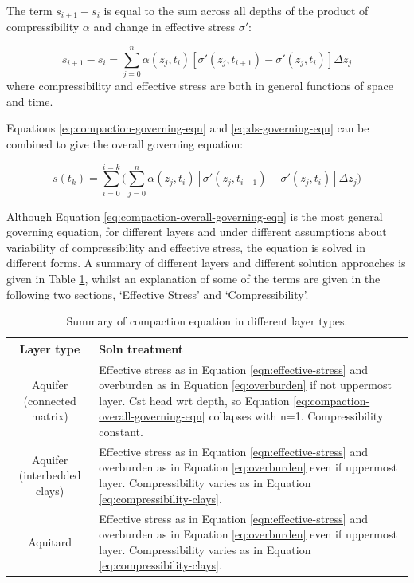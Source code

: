 \documentclass{article}
\begin{document}
The term $s_{i+1} - s_i$ is equal to the sum across all depths of the product of compressibility $\alpha$ and change in effective stress $\sigma'$:

\begin{equation}
s_{i+1} - s_i = \sum_{j=0}^{n} \alpha(z_j,t_i) [\sigma'(z_j,t_{i+1}) - \sigma'(z_j,t_i) ] \Delta z_j
\label{eq:ds-governing-eqn}
\end{equation}
where compressibility and effective stress are both in general functions of space and time.

Equations \ref{eq:compaction-governing-eqn} and \ref{eq:ds-governing-eqn} can be combined to give the overall governing equation:

\begin{equation}
s(t_k) = \sum_{i=0}^{i=k} \bigg(  \sum_{j=0}^{n} \alpha(z_j,t_i) [\sigma'(z_j,t_{i+1}) - \sigma'(z_j,t_i) ] \Delta z_j \bigg)
\label{eq:compaction-overall-governing-eqn}
\end{equation}

Although Equation \ref{eq:compaction-overall-governing-eqn} is the most general governing equation, for different layers and under different assumptions about variability of compressibility and effective stress, the equation is solved in different forms. A summary of different layers and different solution approaches is given in Table \ref{table:compaction-options}, whilst an explanation of some of the terms are given in the following two sections, `Effective Stress' and `Compressibility'.

\begin{table}[h]
\centering
\begin{tabular}{|c|p{9cm}|} 
\hline
\textbf{Layer type} & \textbf{Soln treatment} \\ 
\hline
Aquifer (connected matrix) & Effective stress as in Equation \ref{eqn:effective-stress} and overburden as in Equation \ref{eq:overburden} if not uppermost layer. Cst head wrt depth, so Equation \ref{eq:compaction-overall-governing-eqn} collapses with n=1. Compressibility constant.\\
\hline 
Aquifer (interbedded clays) & Effective stress as in Equation \ref{eqn:effective-stress} and overburden as in Equation \ref{eq:overburden} even if uppermost layer. Compressibility varies as in Equation \ref{eq:compressibility-clays}.\\
\hline 
Aquitard & Effective stress as in Equation \ref{eqn:effective-stress} and overburden as in Equation \ref{eq:overburden} even if uppermost layer. Compressibility varies as in Equation \ref{eq:compressibility-clays}.\\
\hline 
\end{tabular}
\caption{Summary of compaction equation in different layer types.}
\label{table:compaction-options}
\end{table}
\end{document}
